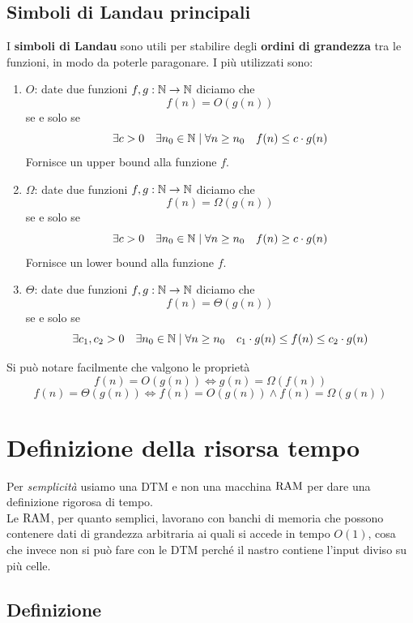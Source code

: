 \subsection{Simboli di Landau principali}

I \textbf{simboli di Landau} sono utili per stabilire degli \textbf{ordini di grandezza} tra le funzioni, in modo da poterle paragonare. I più utilizzati sono:
\begin{enumerate}
	\item $O$: date due funzioni $f,g: \mathbb{N} \rightarrow \mathbb{N}$ diciamo che 
	$$ f(n) = O(g(n)) $$
	se e solo se
	$$ \exists c > 0 \quad \exists n_0 \in \mathbb{N} \mid \forall n \geq n_0 \quad f(n) \leq c \cdot g (n) $$
	Fornisce un upper bound alla funzione $f$.
	
	\item $\Omega$: date due funzioni $f,g: \mathbb{N} \rightarrow \mathbb{N}$ diciamo che 
	$$ f(n) = \Omega (g(n)) $$
	se e solo se
	$$ \exists c > 0 \quad \exists n_0 \in \mathbb{N} \mid \forall n \geq n_0 \quad f(n) \geq c \cdot g (n) $$
	Fornisce un lower bound alla funzione $f$.
	
	\item $\Theta$: date due funzioni $f,g : \mathbb{N} \rightarrow \mathbb{N}$ diciamo che
	$$ f(n) = \Theta (g(n)) $$
	se e solo se
	$$ \exists c_1, c_2 > 0 \quad \exists n_0 \in \mathbb{N} \mid \forall n \geq n_0 \quad c_1 \cdot g(n) \leq f(n) \leq c_2 \cdot g(n) $$
\end{enumerate}

Si può notare facilmente che valgono le proprietà
$$ f(n) = O(g(n)) \Leftrightarrow g(n) = \Omega(f(n)) $$
$$ f(n) = \Theta(g(n)) \Leftrightarrow f(n) = O (g(n)) \wedge f(n) = \Omega(g(n)) $$

\section{Definizione della risorsa tempo}

Per \textit{semplicità} usiamo una DTM e non una macchina $\text{RAM}$ per dare una definizione rigorosa di tempo. \\

Le $\text{RAM}$, per quanto semplici, lavorano con banchi di memoria che possono contenere dati di grandezza arbitraria ai quali si accede in tempo $O(1)$, cosa che invece non si può fare con le DTM perché il nastro contiene l'input diviso su più celle.\\

\subsection{Definizione}

